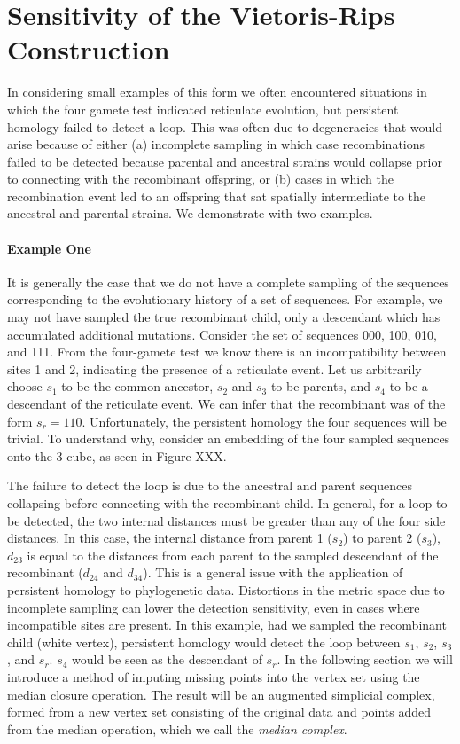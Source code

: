 \section{Sensitivity of the Vietoris-Rips Construction}
\label{complex_construction:sensitivity}

In considering small examples of this form we often encountered situations in which the four gamete test indicated reticulate evolution, but persistent homology failed to detect a loop.
This was often due to degeneracies that would arise because of either (a) incomplete sampling in which case recombinations failed to be detected because parental and ancestral strains would collapse prior to connecting with the recombinant offspring, or (b) cases in which the recombination event led to an offspring that sat spatially intermediate to the ancestral and parental strains.
We demonstrate with two examples.

\paragraph{Example One}
\label{ex:example1}
%
It is generally the case that we do not have a complete sampling of the sequences corresponding to the evolutionary history of a set of sequences.
For example, we may not have sampled the true recombinant child, only a descendant which has accumulated additional mutations.
Consider the set of sequences 000, 100, 010, and 111.
From the four-gamete test we know there is an incompatibility between sites 1 and 2, indicating the presence of a reticulate event.
Let us arbitrarily choose $s_1$ to be the common ancestor, $s_2$ and $s_3$ to be parents, and $s_4$ to be a descendant of the reticulate event.
We can infer that the recombinant was of the form $s_r=110$.
Unfortunately, the persistent homology the four sequences will be trivial.
To understand why, consider an embedding of the four sampled sequences onto the 3-cube, as seen in Figure XXX.

The failure to detect the loop is due to the ancestral and parent sequences collapsing before connecting with the recombinant child.
In general, for a loop to be detected, the two internal distances must be greater than any of the four side distances.
In this case, the internal distance from parent 1 ($s_2$) to parent 2 ($s_3$), $d_{23}$ is equal to the distances from each parent to the sampled descendant of the recombinant ($d_{24}$ and $d_{34}$).
This is a general issue with the application of persistent homology to phylogenetic data.
Distortions in the metric space due to incomplete sampling can lower the detection sensitivity, even in cases where incompatible sites are present.
In this example, had we sampled the recombinant child (white vertex), persistent homology would detect the loop between $s_1$, $s_2$, $s_3$, and $s_r$.
$s_4$ would be seen as the descendant of $s_r$.
In the following section we will introduce a method of imputing missing points into the vertex set using the median closure operation.
The result will be an augmented simplicial complex, formed from a new vertex set consisting of the original data and points added from the median operation, which we call the \emph{median complex}.

